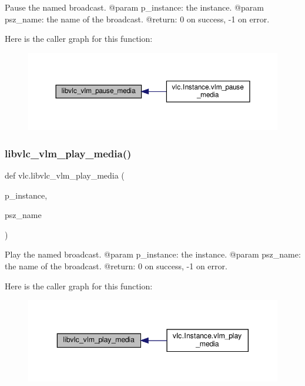 \begin{DoxyVerb}Pause the named broadcast.
@param p_instance: the instance.
@param psz_name: the name of the broadcast.
@return: 0 on success, -1 on error.
\end{DoxyVerb}
 Here is the caller graph for this function\+:
\nopagebreak
\begin{figure}[H]
\begin{center}
\leavevmode
\includegraphics[width=350pt]{namespacevlc_aaad0efdc3c62f78fc9653c58d562e323_icgraph}
\end{center}
\end{figure}
\mbox{\label{namespacevlc_ab243eae217981fa16592409c1d5b9caa}} 
\subsubsection{\texorpdfstring{libvlc\+\_\+vlm\+\_\+play\+\_\+media()}{libvlc\_vlm\_play\_media()}}
{\footnotesize\ttfamily def vlc.\+libvlc\+\_\+vlm\+\_\+play\+\_\+media (\begin{DoxyParamCaption}\item[{}]{p\+\_\+instance,  }\item[{}]{psz\+\_\+name }\end{DoxyParamCaption})}

\begin{DoxyVerb}Play the named broadcast.
@param p_instance: the instance.
@param psz_name: the name of the broadcast.
@return: 0 on success, -1 on error.
\end{DoxyVerb}
 Here is the caller graph for this function\+:
\nopagebreak
\begin{figure}[H]
\begin{center}
\leavevmode
\includegraphics[width=343pt]{namespacevlc_ab243eae217981fa16592409c1d5b9caa_icgraph}
\end{center}
\end{figure}
\mbox{\label{namespacevlc_a4aa32acd52d832cb9637629d14af97fb}} 
